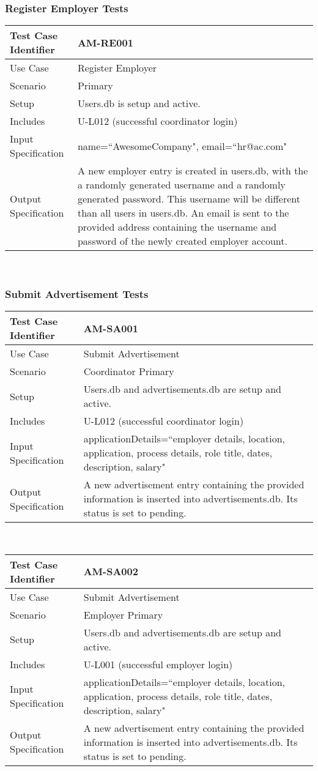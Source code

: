 \documentclass{l3deliverable}
\begin{document}
\subsubsection{Register Employer Tests}
\begin{tabular}{lp{10cm}}
\hline 
\textbf{Test Case Identifier} & AM-RE001\tabularnewline
\hline 
\hline 
Use Case & Register Employer \tabularnewline
\hline 
Scenario & Primary \tabularnewline
\hline 
Setup & Users.db is setup and active.\tabularnewline
\hline 
Includes & U-L012 (successful coordinator login) \tabularnewline
\hline 
Input Specification & name=``AwesomeCompany", email=``hr@ac.com" \tabularnewline
\hline 
Output Specification & A new employer entry is created in users.db, with the a randomly generated username and a randomly generated password. This username will be different than all users in users.db. An email is sent to the provided address containing the username and password of the newly created employer account.\tabularnewline
\hline 
\end{tabular}\\

\subsubsection{Submit Advertisement Tests}
\begin{tabular}{lp{10cm}}
\hline 
\textbf{Test Case Identifier} & AM-SA001\tabularnewline
\hline 
\hline 
Use Case & Submit Advertisement \tabularnewline
\hline 
Scenario & Coordinator Primary \tabularnewline
\hline 
Setup & Users.db and advertisements.db are setup and active.\tabularnewline
\hline 
Includes & U-L012 (successful coordinator login) \tabularnewline
\hline 
Input Specification & applicationDetails=``employer details, location, application, process details, role title, dates, description, salary" \tabularnewline
\hline 
Output Specification & A new advertisement entry containing the provided information is inserted into advertisements.db. Its status is set to pending.\tabularnewline
\hline 
\end{tabular}\\

\begin{tabular}{lp{10cm}}
\hline 
\textbf{Test Case Identifier} & AM-SA002\tabularnewline
\hline 
\hline 
Use Case & Submit Advertisement \tabularnewline
\hline 
Scenario & Employer Primary \tabularnewline
\hline 
Setup & Users.db and advertisements.db are setup and active.\tabularnewline
\hline 
Includes & U-L001 (successful employer login) \tabularnewline
\hline 
Input Specification & applicationDetails=``employer details, location, application, process details, role title, dates, description, salary" \tabularnewline
\hline 
Output Specification & A new advertisement entry containing the provided information is inserted into advertisements.db. Its status is set to pending.\tabularnewline
\hline 
\end{tabular}\\
\end{document}
